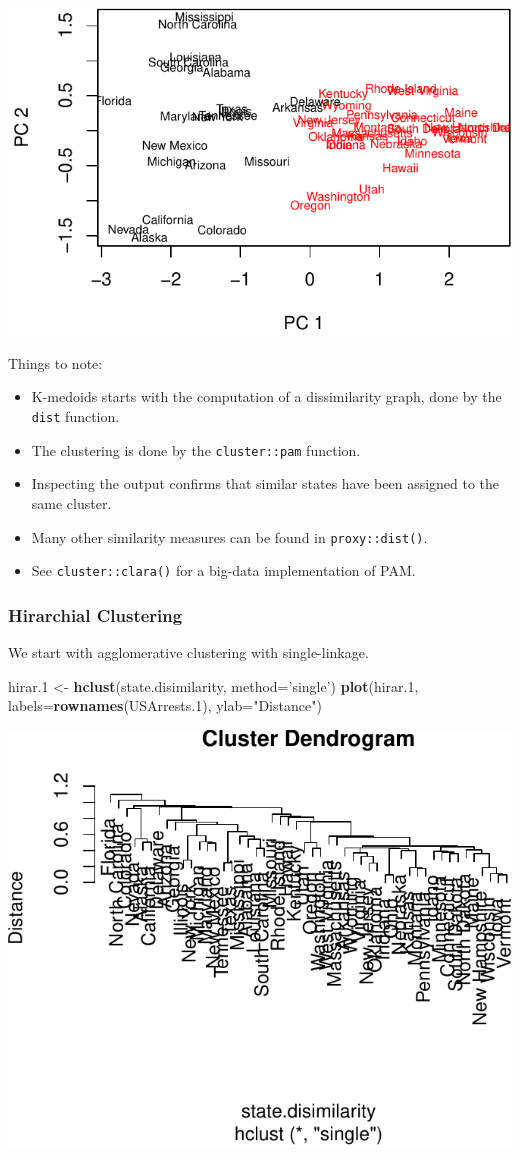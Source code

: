 \documentclass[]{book}
\newenvironment{Shaded}{\begin{snugshade}}{\end{snugshade}}
\newcommand{\DataTypeTok}[1]{\textcolor[rgb]{0.13,0.29,0.53}{#1}}
\newcommand{\FloatTok}[1]{\textcolor[rgb]{0.00,0.00,0.81}{#1}}
\newcommand{\KeywordTok}[1]{\textcolor[rgb]{0.13,0.29,0.53}{\textbf{#1}}}
\newcommand{\NormalTok}[1]{#1}
\newcommand{\StringTok}[1]{\textcolor[rgb]{0.31,0.60,0.02}{#1}}
\providecommand{\tightlist}{%
  \setlength{\itemsep}{0pt}\setlength{\parskip}{0pt}}
\theoremstyle{definition}
\theoremstyle{definition}
\theoremstyle{definition}
\theoremstyle{remark}
\begin{document}
\includegraphics[width=0.5\linewidth]{Rcourse_files/figure-latex/kmedoids-1}

Things to note:

\begin{itemize}
\tightlist
\item
  K-medoids starts with the computation of a dissimilarity graph, done by the \texttt{dist} function.
\item
  The clustering is done by the \texttt{cluster::pam} function.
\item
  Inspecting the output confirms that similar states have been assigned to the same cluster.
\item
  Many other similarity measures can be found in \texttt{proxy::dist()}.
\item
  See \texttt{cluster::clara()} for a big-data implementation of PAM.
\end{itemize}

\hypertarget{hirarchial-clustering-1}{%
\subsubsection{Hirarchial Clustering}\label{hirarchial-clustering-1}}

We start with agglomerative clustering with single-linkage.

\begin{Shaded}
\begin{Highlighting}[]
\NormalTok{hirar}\FloatTok{.1}\NormalTok{ <-}\StringTok{ }\KeywordTok{hclust}\NormalTok{(state.disimilarity, }\DataTypeTok{method=}\StringTok{'single'}\NormalTok{)}
\KeywordTok{plot}\NormalTok{(hirar}\FloatTok{.1}\NormalTok{, }\DataTypeTok{labels=}\KeywordTok{rownames}\NormalTok{(USArrests}\FloatTok{.1}\NormalTok{), }\DataTypeTok{ylab=}\StringTok{"Distance"}\NormalTok{)}
\end{Highlighting}
\end{Shaded}

\includegraphics[width=0.5\linewidth]{Rcourse_files/figure-latex/HirarchialClustering-1}
\end{document}
